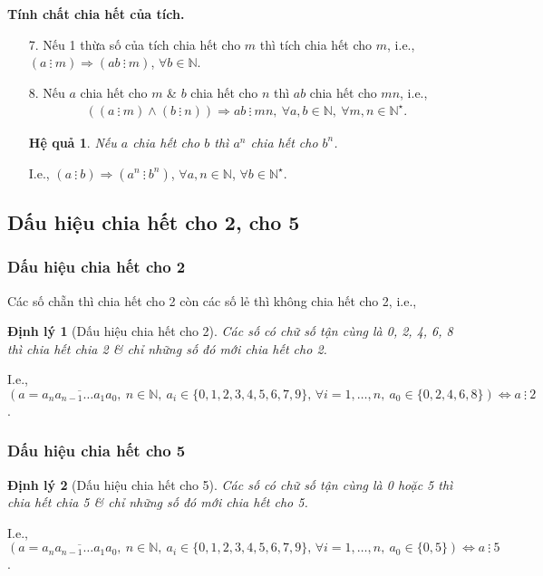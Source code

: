 \documentclass{article}
\numberwithin{equation}{section}
\newtheorem{hequa}{Hệ quả}[section]
\newtheorem{dinhly}{Định lý}[section]
\begin{document}
\noindent\textbf{Tính chất chia hết của tích.}
\begin{enumerate}
	\item[7.] Nếu 1 thừa số của tích chia hết cho $m$ thì tích chia hết cho $m$, i.e., $(a\ \vdots\ m)\Rightarrow(ab\ \vdots\ m)$, $\forall b\in\mathbb{N}$.
	\item[8.] Nếu $a$ chia hết cho $m$ \& $b$ chia hết cho $n$ thì $ab$ chia hết cho $mn$, i.e.,
	\begin{align*}
		((a\ \vdots\ m)\land(b\ \vdots\ n))\Rightarrow ab\ \vdots\ mn,\ \forall a,b\in\mathbb{N},\ \forall m,n\in\mathbb{N}^\star.
	\end{align*}

	\begin{hequa}
		Nếu $a$ chia hết cho $b$ thì $a^n$ chia hết cho $b^n$.
	\end{hequa}
	I.e., $(a\ \vdots\ b)\Rightarrow(a^n\ \vdots\ b^n)$, $\forall a,n\in\mathbb{N}$, $\forall b\in\mathbb{N}^\star$.
\end{enumerate}


\subsection{Dấu hiệu chia hết cho 2, cho 5}

\subsubsection{Dấu hiệu chia hết cho 2}
Các số chẵn thì chia hết cho 2 còn các số lẻ thì không chia hết cho 2, i.e.,

\begin{dinhly}[Dấu hiệu chia hết cho 2]
	Các số có chữ số tận cùng là 0, 2, 4, 6, 8 thì chia hết chia 2 \textit{\&} chỉ những số đó mới chia hết cho 2.
\end{dinhly}
I.e., $(a = \overline{a_na_{n-1}\ldots a_1a_0},\ n\in\mathbb{N},\ a_i\in\{0,1,2,3,4,5,6,7,9\},\,\forall i = 1,\ldots,n,\ a_0\in\{0,2,4,6,8\})\Leftrightarrow a\ \vdots\ 2$.

\subsubsection{Dấu hiệu chia hết cho 5}
\begin{dinhly}[Dấu hiệu chia hết cho 5]
	Các số có chữ số tận cùng là 0 hoặc 5 thì chia hết chia 5 \textit{\&} chỉ những số đó mới chia hết cho 5.
\end{dinhly}
I.e., $(a = \overline{a_na_{n-1}\ldots a_1a_0},\ n\in\mathbb{N},\ a_i\in\{0,1,2,3,4,5,6,7,9\},\,\forall i = 1,\ldots,n,\ a_0\in\{0,5\})\Leftrightarrow a\ \vdots\ 5$.
\end{document}
